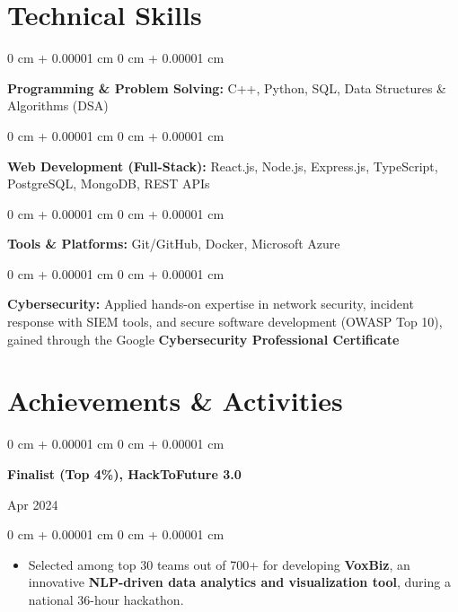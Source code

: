 \documentclass[10pt, letterpaper]{article}
\newenvironment{highlights}{
    \begin{itemize}[
        topsep=0.10 cm,
        parsep=0.10 cm,
        partopsep=0pt,
        itemsep=0pt,
        leftmargin=0 cm + 10pt
    ]
}{
    \end{itemize}
} %
\newenvironment{onecolentry}{
    \begin{adjustwidth}{
        0 cm + 0.00001 cm
    }{
        0 cm + 0.00001 cm
    }
}{
    \end{adjustwidth}
} %
\newenvironment{twocolentry}[2][]{
    \onecolentry
    \def\secondColumn{#2}
    \setcolumnwidth{\fill, 4.5 cm}
    \begin{paracol}{2}
}{
    \switchcolumn \raggedleft \secondColumn
    \end{paracol}
    \endonecolentry
} %
\begin{document}
    \section{Technical Skills}

        \begin{onecolentry}
    \textbf{Programming \& Problem Solving:} C++, Python, SQL, Data Structures \& Algorithms (DSA)
\end{onecolentry}

\vspace{0.2 cm}

\begin{onecolentry}
    \textbf{Web Development (Full-Stack):} React.js, Node.js, Express.js, TypeScript, PostgreSQL, MongoDB, REST APIs
\end{onecolentry}

\vspace{0.2 cm}

\begin{onecolentry}
    \textbf{Tools \& Platforms:} Git/GitHub, Docker, Microsoft Azure
\end{onecolentry}

\vspace{0.2 cm}

\begin{onecolentry}
    \textbf{Cybersecurity:} Applied hands-on expertise in network security, incident response with SIEM tools, and secure software development (OWASP Top 10), gained through the Google \textbf{Cybersecurity Professional Certificate}
\end{onecolentry}

    \section{Achievements \& Activities}

\begin{twocolentry}{
    Apr 2024
}
    \textbf{\textcolor{blueHighlight}{Finalist (Top 4\%), HackToFuture 3.0}}
\end{twocolentry}

\vspace{0.05 cm}
\begin{onecolentry}
    \begin{highlights}
        \item Selected among top 30 teams out of 700+ for developing \textbf{VoxBiz}, an innovative \textbf{NLP-driven data analytics and visualization tool}, during a national 36-hour hackathon.
    \end{highlights}
\end{onecolentry}
\end{document}
